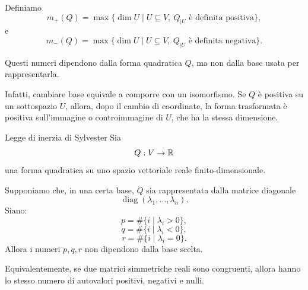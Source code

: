 \documentclass[a4paper]{article}
\begin{document}
Definiamo
\[
    m_+(Q)
    =
    \max\{\dim U\mid U\subseteq V,\ Q_{\mid U}\text{ è definita positiva}\},
\]
e
\[
    m_-(Q)
    =
    \max\{\dim U\mid U\subseteq V,\ Q_{\mid U}\text{ è definita negativa}\}.
\]

Questi numeri dipendono dalla forma quadratica \(Q\), ma non dalla base usata per rappresentarla.

Infatti, cambiare base equivale a comporre con un isomorfismo. Se \(Q\) è positiva su un sottospazio \(U\), allora, dopo il cambio di coordinate, la forma trasformata è positiva sull'immagine o controimmagine di \(U\), che ha la stessa dimensione.

\begin{snippettheorem}{Legge di inerzia di Sylvester}
    Sia
    \[
        Q:V\to\mathbb{R}
    \]
    una forma quadratica su uno spazio vettoriale reale finito-dimensionale.

    Supponiamo che, in una certa base, \(Q\) sia rappresentata dalla matrice diagonale
    \[
        \operatorname{diag}(\lambda_1,\ldots,\lambda_n).
    \]
    Siano:
    \[
        p=\#\{i\mid \lambda_i>0\},
    \]
    \[
        q=\#\{i\mid \lambda_i<0\},
    \]
    \[
        r=\#\{i\mid \lambda_i=0\}.
    \]
    Allora i numeri \(p,q,r\) non dipendono dalla base scelta.

    Equivalentemente, se due matrici simmetriche reali sono congruenti, allora hanno lo stesso numero di autovalori positivi, negativi e nulli.
\end{snippettheorem}
\end{document}
